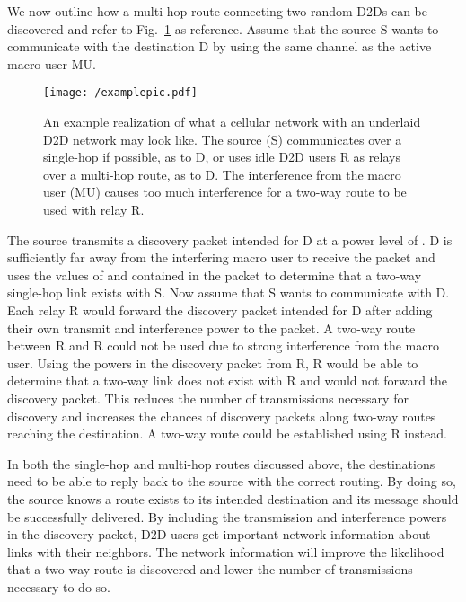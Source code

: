 \documentclass[10pt, final, journal, letterpaper,oneside, twocolumn]{IEEEtran}
\begin{document}
We now outline how a multi-hop route connecting two random D2Ds can be discovered and refer to Fig.~\ref{fig:example} as reference.  Assume that the source S wants to communicate with the destination D by using the same channel as the active macro user MU.
\begin{figure}[htp]
\center
 \texttt{[image: /examplepic.pdf]}
 \caption[]{An example realization of what a cellular network with an underlaid D2D network may look like.  The source (S) communicates over a single-hop if possible, as to D, or uses idle D2D users R as relays over a multi-hop route, as to D.  The interference from the macro user (MU) causes too much interference for a two-way route to be used with relay R. } 
  \label{fig:example}
\end{figure}
The source transmits a discovery packet intended for D at a power level of .  D is sufficiently far away from the interfering macro user to receive the packet and uses the values of  and  contained in the packet to determine that a two-way single-hop link exists with S.  Now assume that S wants to communicate with D.  Each relay R would forward the discovery packet intended for D after adding their own transmit and interference power to the packet.  A two-way route between R and R could not be used due to strong interference from the macro user.  Using the powers in the discovery packet from R, R would be able to determine that a two-way link does not exist with R and would not forward the discovery packet.  This reduces the number of transmissions necessary for discovery and increases the chances of discovery packets along two-way routes reaching the destination.  A two-way route could be established using R instead.  

In both the single-hop and multi-hop routes discussed above, the destinations need to be able to reply back to the source with the correct routing.  By doing so, the source knows a route exists to its intended destination and its message should be successfully delivered.  By including the transmission and interference powers in the discovery packet, D2D users get important network information about links with their neighbors.  The network information will improve the likelihood that a two-way route is discovered and lower the number of transmissions necessary to do so.  
\end{document}
